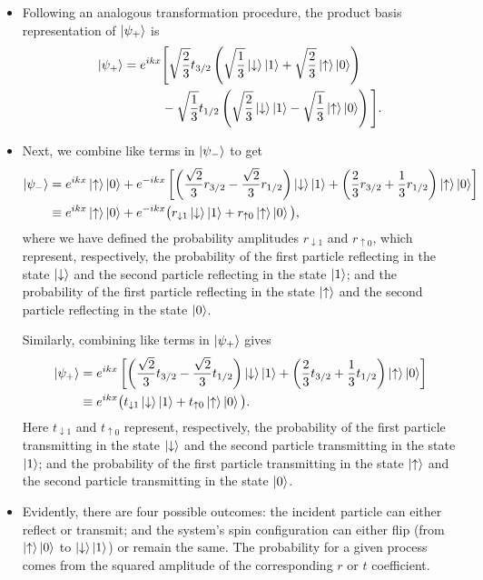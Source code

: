\documentclass[11pt, a4paper]{article}
\newcommand{\ua}{\uparrow}  %
\newcommand{\da}{\downarrow}  %
\begin{document}
\begin{itemize}
	\item Following an analogous transformation procedure, the product basis representation of $ \ket{\psi_{+}} $ is
	\begin{align*}
		\ket{\psi_{+}} =  e^{ikx}& \Bigg[\sqrt{\frac{2}{3}}t_{3/2}\left(\sqrt{\frac{1}{3}}\ket{\da}\ket{1} +  \sqrt{\frac{2}{3}}\ket{\ua}\ket{0}\right) \\
		&- \sqrt{\frac{1}{3}}t_{1/2}\left( \sqrt{\frac{2}{3}}\ket{\da}\ket{1} - \sqrt{\frac{1}{3}}\ket{\ua}\ket{0} \right)\Bigg].
	\end{align*}
	
	\item Next, we combine like terms in $ \ket{\psi_{-}} $ to get
	\begin{align*}
		\ket{\psi_{-}} &= e^{ikx}\ket{\ua}\ket{0} + e^{-ikx}\left[\left(\frac{\sqrt{2}}{3}r_{3/2} - \frac{\sqrt{2}}{3}r_{1/2}\right)\ket{\da}\ket{1} + \left(\frac{2}{3}r_{3/2} + \frac{1}{3}r_{1/2}\right)\ket{\ua}\ket{0}\right]\\
		&\equiv e^{ikx}\ket{\ua}\ket{0} + e^{-ikx}\big(r_{\da 1}\ket{\da}\ket{1} + r_{\ua 0}\ket{\ua}\ket{0}\big),
	\end{align*}
	where we have defined the probability amplitudes $ r_{\da 1} $ and $ r_{\ua 0} $, which represent, respectively, the probability of the first particle reflecting in the state $ \ket{\da} $ and the second particle reflecting in the state $ \ket{1} $; and the probability of the first particle reflecting in the state $ \ket{\ua} $ and the second particle reflecting in the state $ \ket{0} $. 
	
	
	Similarly, combining like terms in $ \ket{\psi_{+}} $ gives 
	\begin{align*}
		\ket{\psi_{+}} &= e^{ikx}\left[\left(\frac{\sqrt{2}}{3}t_{3/2} - \frac{\sqrt{2}}{3}t_{1/2}\right)\ket{\da}\ket{1} + \left(\frac{2}{3}t_{3/2} + \frac{1}{3}t_{1/2}\right)\ket{\ua}\ket{0}\right]\\
		& \equiv e^{ikx} \big( t_{\da 1}\ket{\da}\ket{1} + t_{\ua 0}\ket{\ua}\ket{0} \big).
	\end{align*}
	Here $ t_{\da 1} $ and $ t_{\ua 0} $ represent, respectively, the probability of the first particle transmitting in the state $ \ket{\da} $ and the second particle transmitting in the state $ \ket{1} $; and the probability of the first particle transmitting in the state $ \ket{\ua} $ and the second particle transmitting in the state $ \ket{0} $.
	
	\item Evidently, there are four possible outcomes: the incident particle can either reflect or transmit; and the system's spin configuration can either flip (from $ \ket{\ua}\ket{0} $ to $ \ket{\da}\ket{1} $) or remain the same. The probability for a given process comes from the squared amplitude of the corresponding $ r $ or $ t $ coefficient.
	

\end{itemize}
\end{document}
